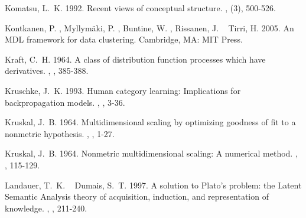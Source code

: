 \documentclass[11pt]{article}
\begin{document}
\begin{thebibliography}{}
%
%
Komatsu, L.~K.%
%
\newblock{}\BBOP{}1992\BBCP{}.
\newblock{}\BBOQ{}Recent views of conceptual structure.\BBCQ{}
\newblock{}, (3), 500-526.

%
%
Kontkanen, P.%
, Myllym\"{a}ki, P.%
, Buntine, W.%
, Rissanen, J.%
\BCBL{}\ \BBA{} Tirri, H.%
%
\newblock{}\BBOP{}2005\BBCP{}.
\newblock{}\BBOQ{}An {MDL} framework for data clustering.\BBCQ{}
\newblock{}\BIn{} 
\newblock{}Cambridge, MA: MIT Press.

%
%
Kraft, C.~H.%
%
\newblock{}\BBOP{}1964\BBCP{}.
\newblock{}\BBOQ{}A class of distribution function processes which have
  derivatives.\BBCQ{}
\newblock{}, , 385-388.

%
%
Kruschke, J.~K.%
%
\newblock{}\BBOP{}1993\BBCP{}.
\newblock{}\BBOQ{}Human category learning: Implications for backpropagation
  models.\BBCQ{}
\newblock{}, , 3-36.

%
%
Kruskal, J.~B.%
%
\newblock{}\BBOP{}1964{\protect{}}\BBCP{}.
\newblock{}\BBOQ{}Multidimensional scaling by optimizing goodness of fit to a
  nonmetric hypothesis.\BBCQ{}
\newblock{}, , 1-27.

%
%
Kruskal, J.~B.%
%
\newblock{}\BBOP{}1964{\protect{}}\BBCP{}.
\newblock{}\BBOQ{}Nonmetric multidimensional scaling: A numerical
  method.\BBCQ{}
\newblock{}, , 115-129.

%
%
Landauer, T.~K.%
\BCBT{}\ \BBA{} Dumais, S.~T.%
%
\newblock{}\BBOP{}1997\BBCP{}.
\newblock{}\BBOQ{}A solution to {P}lato's problem: the {L}atent {S}emantic
  {A}nalysis theory of acquisition, induction, and representation of
  knowledge.\BBCQ{}
\newblock{}, , 211-240.


\end{thebibliography}
\end{document}
